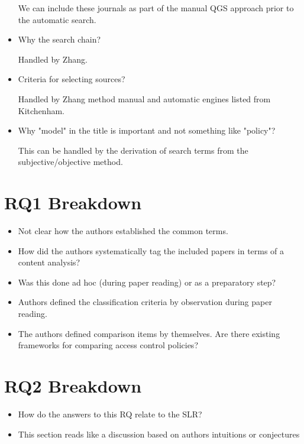 \begin{itemize}
We can include these journals as part of the manual QGS approach prior to the automatic search.

\item Why the search chain?

Handled by Zhang.

\item Criteria for selecting sources?

Handled by Zhang method manual and automatic engines listed from Kitchenham.

\item Why "model" in the title is important and not something like "policy"?

This can be handled by the derivation of search terms from the subjective/objective method.

\end{itemize}


\section{RQ1 Breakdown}

\begin{itemize}

\item Not clear how the authors established the common terms.

\item How did the authors systematically tag the included papers in terms of a content analysis?

\item Was this done ad hoc (during paper reading) or as a preparatory step?

\item Authors defined the classification criteria by observation during paper reading.

\item The authors defined comparison items by themselves. Are there existing frameworks for comparing access control policies?

\end{itemize}


\section{RQ2 Breakdown}

\begin{itemize}

\item How do the answers to this RQ relate to the SLR?

\item This section reads like a discussion based on authors intuitions or conjectures

\end{itemize}


